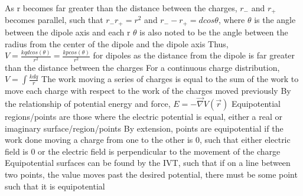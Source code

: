 \documentclass[11 pt, twoside]{article}
\newenvironment{outline*}
{
	\begin{outline}[enumerate]
	}
	{\end{outline}
}
\begin{document}
\begin{outline*}
\3 As r becomes far greater than the distance between the charges, $r_-$ and $r_+$ becomes parallel, such that $r_-r_+ = r^2$ and $r_- - r_+ = dcos\theta$, where $\theta$ is the angle between the dipole axis and each r
\4 $\theta$ is also noted to be the angle between the radius from the center of the dipole and the dipole axis
\3 Thus, $V = \frac{kqdcos(\theta)}{r^2} = \frac{kpcos(\theta)}{r^2}$ for dipoles as the distance from the dipole is far greater than the distance between the charges
\2 For a continuous charge distribution, $V = \int \frac{kdq}{r}$
\1 The work moving a series of charges is equal to the sum of the work to move each charge with respect to the work of the charges moved previously
\1 By the relationship of potential energy and force, $E = -\vec{\nabla} V(\vec{r})$
\1 Equipotential regions/points are those where the electric potential is equal, either a real or imaginary surface/region/points
\2 By extension, points are equipotential if the work done moving a charge from one to the other is 0, such that either electric field is 0 or the electric field is perpendicular to the movement of the charge
\2 Equipotential surfaces can be found by the IVT, such that if on a line between two points, the value moves past the desired potential, there must be some point such that it is equipotential
\end{outline*}
\end{document}
